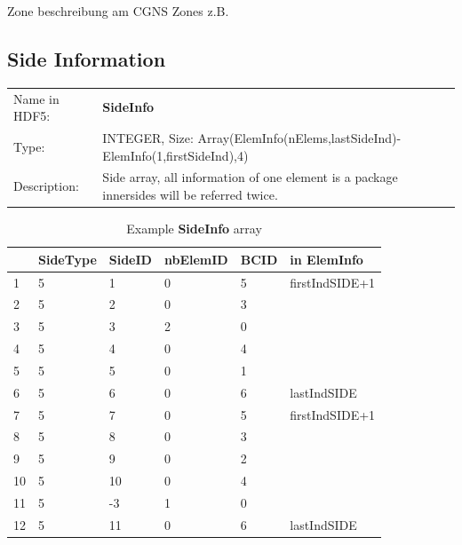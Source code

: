 Zone beschreibung am CGNS Zones z.B.

\newpage

\subsection{Side Information}

\begin{table}[h!]
\begin{tabularx}{1.0\textwidth}{lX}
Name in HDF5: & \textbf{SideInfo} \\
Type:         & INTEGER, Size: Array(ElemInfo(nElems,lastSideInd)-ElemInfo(1,firstSideInd),4) \\
Description:  & Side array, all information of one element is a package innersides will be referred twice. \\
\end{tabularx}
\end{table}

\begin{table}[h!]
\centering
\begin{tabular}{|l|l|l|l|l|l|}
\hline
 & SideType & SideID & nbElemID & BCID & in \textbf{ElemInfo}\\ \hline
1 & 5 & 1 & 0 & 5 &  firstIndSIDE+1 \\ 
2 & 5 & 2 & 0 & 3 &  \\ 
3 & 5 & 3 & 2 & 0 &  \\ 
4 & 5 & 4 & 0 & 4 &  \\ 
5 & 5 & 5 & 0 & 1 &  \\ 
6 & 5 & 6 & 0 & 6 &  lastIndSIDE \\ \hline
7 & 5 & 7 & 0 & 5 &  firstIndSIDE+1 \\ 
8 & 5 & 8 & 0 & 3 &  \\ 
9 & 5 & 9 & 0 & 2 &  \\ 
10 & 5 & 10 & 0 & 4 &  \\ 
11 & 5 & -3 & 1 & 0 &  \\ 
12 & 5 & 11 & 0 & 6 & lastIndSIDE \\ \hline
\end{tabular}
\caption{Example \textbf{SideInfo} array}
\end{table}

